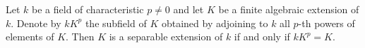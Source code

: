Let $k$ be a field of characteristic $p \neq 0$ and let $K$ be a finite algebraic extension of $k$. Denote by $kK^p$ the subfield of $K$ obtained by adjoining to $k$ all $p$-th powers of elements of $K$. Then $K$ is a separable extension of $k$ if and only if $kK^p = K$.
